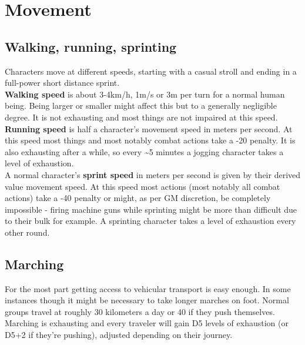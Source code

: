 \documentclass[12pt,a4paper,openany,dvipsnames]{book}
\begin{document}
	

	\chapter{Movement}
	\section{Walking, running, sprinting}
	Characters move at different speeds, starting with a casual stroll and ending in a full-power short distance sprint.\\
	\textbf{Walking speed} is about 3-4km/h, 1m/s or 3m per turn for a normal human being. Being larger or smaller might affect this but to a generally negligible degree. It is not exhausting and most things are not impaired at this speed.\\
	\textbf{Running speed} is half a character’s movement speed in meters per second. At this speed most things and most notably combat actions take a -20 penalty. It is also exhausting after a while, so every \sim 5 minutes a jogging character takes a level of exhaustion.\\
	A normal character’s \textbf{sprint speed} in meters per second is given by their derived value movement speed.
	At this speed most actions (most notably all combat actions)
		take a -40 penalty
		or might, as per GM discretion, be completely impossible
		- firing machine guns while sprinting might be more than difficult due to their bulk for example.
	A sprinting character takes a level of exhaustion every other round.
	\section{Marching}
	For the most part getting access to vehicular transport is easy enough. In some instances though it might be necessary to take longer marches on foot. Normal groups travel at roughly 30 kilometers a day or 40 if they push themselves. Marching is exhausting and every traveler will gain D5 levels of exhaustion (or D5+2 if they're pushing), adjusted depending on their journey.
\end{document}
